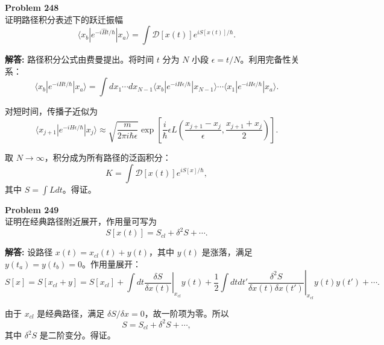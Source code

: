 \documentclass[12pt, a4paper, oneside]{ctexart}
\newenvironment{solution}{\par\noindent\textbf{解答:}\quad}{\par}
\begin{document}
\begin{mdframed}[backgroundcolor=gray!10, linewidth=0pt]
    \textbf{Problem 248} \\
    证明路径积分表述下的跃迁振幅
    \[
    \langle x_b | e^{-i \hat{H} t / \hbar} | x_a \rangle = \int \mathcal{D}[x(t)] e^{i S[x(t)] / \hbar}.
    \]
\end{mdframed}
\begin{solution}
    路径积分公式由费曼提出。将时间 $t$ 分为 $N$ 小段 $\epsilon = t/N$。利用完备性关系：
    \[
    \langle x_b | e^{-i H t / \hbar} | x_a \rangle = \int dx_1 \cdots dx_{N-1} \langle x_b | e^{-i H \epsilon / \hbar} | x_{N-1} \rangle \cdots \langle x_1 | e^{-i H \epsilon / \hbar} | x_a \rangle.
    \]
    
    对短时间，传播子近似为
    \[
    \langle x_{j+1} | e^{-i H \epsilon / \hbar} | x_j \rangle \approx \sqrt{\frac{m}{2\pi i \hbar \epsilon}} \exp\left[ \frac{i}{\hbar} \epsilon L\left( \frac{x_{j+1} - x_j}{\epsilon}, \frac{x_{j+1}+x_j}{2} \right) \right].
    \]
    
    取 $N \to \infty$，积分成为所有路径的泛函积分：
    \[
    K = \int \mathcal{D}[x(t)] e^{i S[x]/\hbar},
    \]
    其中 $S = \int L dt$。得证。
\end{solution}

\begin{mdframed}[backgroundcolor=gray!10, linewidth=0pt]
    \textbf{Problem 249} \\
    证明在经典路径附近展开，作用量可写为
    \[
    S[x(t)] = S_{cl} + \delta^2 S + \cdots.
    \]
\end{mdframed}
\begin{solution}
    设路径 $x(t) = x_{cl}(t) + y(t)$，其中 $y(t)$ 是涨落，满足 $y(t_a)=y(t_b)=0$。作用量展开：
    \[
    S[x] = S[x_{cl} + y] = S[x_{cl}] + \int dt \left. \frac{\delta S}{\delta x(t)} \right|_{x_{cl}} y(t) + \frac{1}{2} \int dt dt' \left. \frac{\delta^2 S}{\delta x(t) \delta x(t')} \right|_{x_{cl}} y(t) y(t') + \cdots.
    \]
    
    由于 $x_{cl}$ 是经典路径，满足 $\delta S / \delta x = 0$，故一阶项为零。所以
    \[
    S = S_{cl} + \delta^2 S + \cdots,
    \]
    其中 $\delta^2 S$ 是二阶变分。得证。
\end{solution}
\end{document}
